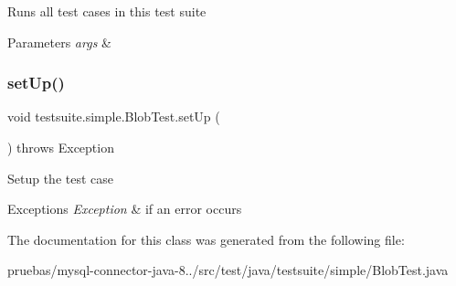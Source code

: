 Runs all test cases in this test suite


\begin{DoxyParams}{Parameters}
{\em args} & \\
\hline
\end{DoxyParams}
\mbox{\label{classtestsuite_1_1simple_1_1_blob_test_a81577d1e5c0481dee0a1b3f5638081df}} 
\subsubsection{\texorpdfstring{set\+Up()}{setUp()}}
{\footnotesize\ttfamily void testsuite.\+simple.\+Blob\+Test.\+set\+Up (\begin{DoxyParamCaption}{ }\end{DoxyParamCaption}) throws Exception}

Setup the test case


\begin{DoxyExceptions}{Exceptions}
{\em Exception} & if an error occurs \\
\hline
\end{DoxyExceptions}


The documentation for this class was generated from the following file\+:\begin{DoxyCompactItemize}
\item 
pruebas/mysql-\/connector-\/java-\/8../src/test/java/testsuite/simple/Blob\+Test.\+java\end{DoxyCompactItemize}
